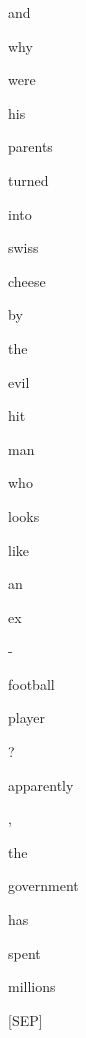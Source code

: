 \documentclass[varwidth=150mm]{standalone}
\begin{document}
\begin{CJK*}{UTF8}{gbsn}
{{{\colorbox{red!6.225473403930664}{\strut and} \colorbox{red!0.0}{\strut why} \colorbox{red!0.0}{\strut were} \colorbox{red!8.059320449829102}{\strut his} \colorbox{red!18.631309509277344}{\strut parents} \colorbox{red!7.791923999786377}{\strut turned} \colorbox{red!2.0629663467407227}{\strut into} \colorbox{red!14.981610298156738}{\strut swiss} \colorbox{red!0.0}{\strut cheese} \colorbox{red!0.0}{\strut by} \colorbox{red!0.0}{\strut the} \colorbox{red!2.0445845127105713}{\strut evil} \colorbox{red!9.024872779846191}{\strut hit} \colorbox{red!1.0079234838485718}{\strut man} \colorbox{red!0.0}{\strut who} \colorbox{red!3.7675161361694336}{\strut looks} \colorbox{red!1.0983736515045166}{\strut like} \colorbox{red!1.719301462173462}{\strut an} \colorbox{red!4.018267631530762}{\strut ex} \colorbox{red!1.8385539054870605}{\strut -} \colorbox{red!4.687795639038086}{\strut football} \colorbox{red!1.9837605953216553}{\strut player} \colorbox{red!1.7909942865371704}{\strut ?} \colorbox{red!6.618420124053955}{\strut apparently} \colorbox{red!0.0}{\strut ,} \colorbox{red!3.150563955307007}{\strut the} \colorbox{red!57.14301681518555}{\strut government} \colorbox{red!5.95024299621582}{\strut has} \colorbox{red!3.7078347206115723}{\strut spent} \colorbox{red!31.27029037475586}{\strut millions} \colorbox{red!1.5494788885116577}{\strut [SEP]}
}}}
\end{CJK*}
\end{document}
